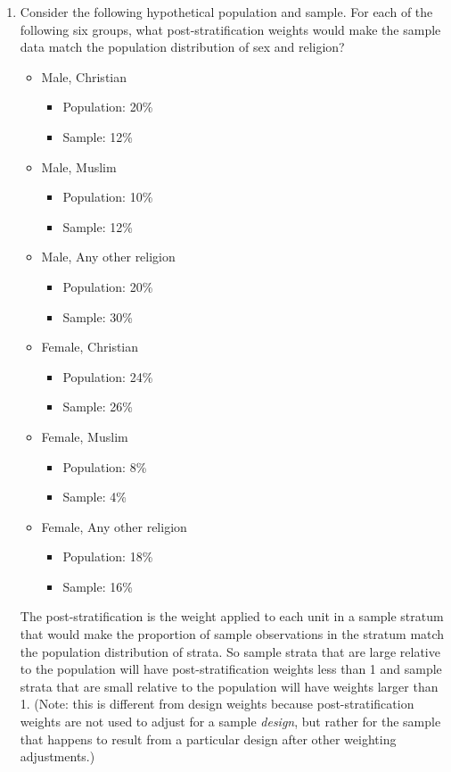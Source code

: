 \documentclass[a4paper]{exam}
\begin{document}
\begin{enumerate}
\item Consider the following hypothetical population and sample. For each of the following six groups, what post-stratification weights would make the sample data match the population distribution of sex and religion?
\begin{itemize}
\item Male, Christian
  \begin{itemize}
  \item Population: 20\%
  \item Sample: 12\%
  \end{itemize}
\item Male, Muslim
  \begin{itemize}
  \item Population: 10\%
  \item Sample: 12\%
  \end{itemize}
\item Male, Any other religion
  \begin{itemize}
  \item Population: 20\%
  \item Sample: 30\%
  \end{itemize}
\item Female, Christian
  \begin{itemize}
  \item Population: 24\%
  \item Sample: 26\%
  \end{itemize}
\item Female, Muslim
  \begin{itemize}
  \item Population: 8\%
  \item Sample: 4\%
  \end{itemize}
\item Female, Any other religion
  \begin{itemize}
  \item Population: 18\%
  \item Sample: 16\%
  \end{itemize}
\end{itemize}

\begin{solution}

The post-stratification is the weight applied to each unit in a sample stratum that would make the proportion of sample observations in the stratum match the population distribution of strata. So sample strata that are large relative to the population will have post-stratification weights less than 1 and sample strata that are small relative to the population will have weights larger than 1. (Note: this is different from design weights because post-stratification weights are not used to adjust for a sample \textit{design}, but rather for the sample that happens to result from a particular design after other weighting adjustments.)


\end{solution}
\end{enumerate}
\end{document}
